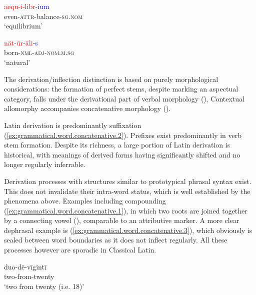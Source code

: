 \documentclass[a4paper, oneside, 12pt]{report}
\newcommand*{\citesec}[1]{\S~{#1}}
\newcommand{\form}[1]{\emph{#1}}
\newcommand*{\category}[1]{\textsc{#1}}
\newcommand{\translate}[1]{`#1'}
\begin{document}
\begin{exe}
    \ex \label{ex:grammatical.word.concatenative.1}
    \gll \textcolor{red}{aequ-i-libr}-\textcolor{blue}{ium} \\ 
    even-\category{attr}-balance-\category{sg.nom} \\ 
    \glt\translate{equilibrium}

    \ex  \label{ex:grammatical.word.concatenative.2}
    \gll \textcolor{red}{nāt-ūr-āli}-\textcolor{blue}{s}  \\ 
    born-\category{nml}-\category{adj}-\category{nom.m.sg} \\ 
    \glt\translate{natural}
\end{exe}


The derivation/inflection distinction is based on purely morphological considerations:
the formation of perfect stems, despite marking an aspectual category, falls under the derivational part of verbal morphology ().
Contextual allomorphy accompanies concatenative morphology (). 

Latin derivation is predominantly suffixation (\ref{ex:grammatical.word.concatenative.2}). 
Prefixes exist predominantly in verb stem formation.
Despite its richness, a large portion of Latin derivation is historical,
with meanings of derived forms having significantly shifted and no longer regularly inferrable.



Derivation processes with structures similar to prototypical phrasal syntax exist.
This does not invalidate their intra-word status, which is well established by the phenomena above.
Examples including compounding (\ref{ex:grammatical.word.concatenative.1}),
in which two roots are joined together by a connecting vowel (\citealt[\citesec{92}]{smith2016greek}), comparable to an attributive marker.
A more clear dephrasal example is (\ref{ex:grammatical.word.concatenative.3}), 
which obviously is sealed between word boundaries as it does not inflect regularly.
All these processes however are sporadic in Classical Latin.

\begin{exe}
    \ex\label{ex:grammatical.word.concatenative.3} 
    \gll duo-dē-vīgintī \\ 
    two-from-twenty \\ 
    \glt\translate{two from twenty (i.e. 18)}
\end{exe}
\end{document}
